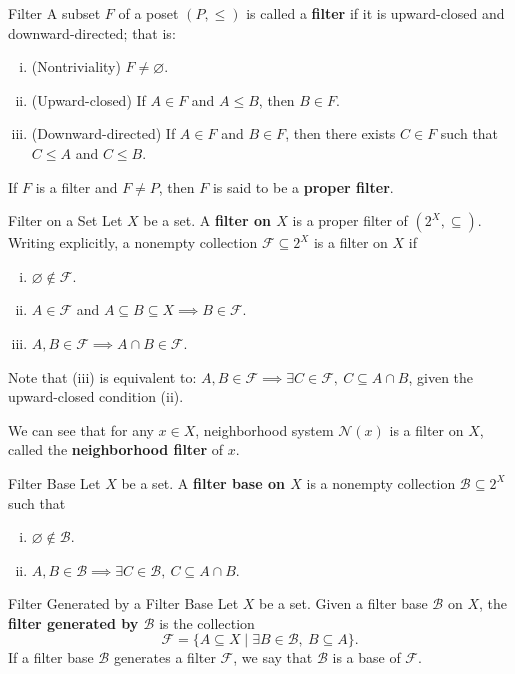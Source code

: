 \documentclass{report}
\begin{document}
\begin{definition}{Filter}{}
	A subset $F$ of a poset $(P,\le)$ is called a \textbf{filter} if it is upward-closed and downward-directed; that is:
	\begin{enumerate}[(i)]
		\item (Nontriviality) $F\ne \varnothing$.
		\item (Upward-closed) If $A \in F$ and $A \le B$, then $B \in F$.
		\item (Downward-directed) If $A \in F$ and $B \in F$, then there exists $C \in F$ such that $C \le A$ and $C \le B$.
	\end{enumerate}
	If $F$ is a filter and $F \ne P$, then $F$ is said to be a \textbf{proper filter}. 
\end{definition}


\begin{definition}{Filter on a Set}{}
	Let $X$ be a set. A \textbf{filter on $X$} is a proper filter of $(2^X,\subseteq)$. Writing explicitly, a nonempty collection $\mathcal{F}\subseteq 2^X$ is a filter on $X$ if
	\begin{enumerate}[(i)]
		\item $\varnothing\notin\mathcal{F}$.
		\item $A\in\mathcal{F}$ and $A\subseteq B\subseteq X\implies B\in\mathcal{F}$.
		\item $A,B\in\mathcal{F}\implies A\cap B\in\mathcal{F}$.
	\end{enumerate}
\end{definition}

Note that (iii) is equivalent to: $A,B\in\mathcal{F}\implies \exists C\in\mathcal{F},\ C\subseteq A\cap B$, given the upward-closed condition (ii).

We can see that for any $x\in X$, neighborhood system $\mathcal{N}(x)$ is a filter on $X$, called the \textbf{neighborhood filter} of $x$.

\begin{definition}{Filter Base}{}
	Let $X$ be a set. A \textbf{filter base on $X$} is a nonempty collection $\mathcal{B}\subseteq 2^X$ such that
	\begin{enumerate}[(i)]
		\item $\varnothing\notin\mathcal{B}$.
		\item $A,B\in\mathcal{B}\implies \exists C\in\mathcal{B},\ C\subseteq A\cap B$.
	\end{enumerate}
\end{definition}

\begin{definition}{Filter Generated by a Filter Base}{}
	Let $X$ be a set. Given a filter base $\mathcal{B}$ on $X$, the \textbf{filter generated by $\mathcal{B}$} is the collection
	\[
		\mathcal{F}=\{A\subseteq X\mid \exists B\in\mathcal{B},\ B\subseteq A\}.
	\]
	If a filter base $\mathcal{B}$ generates a filter $\mathcal{F}$, we say that $\mathcal{B}$ is a base of $\mathcal{F}$.
\end{definition}
\end{document}
